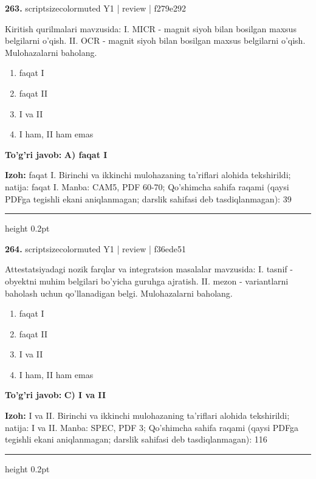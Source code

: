 \documentclass[10pt,a4paper]{article}
\begin{document}
{\bfseries\sffamily\color{ink} 263.} {scriptsizecolor{muted} Y1 | review | f279e292}
\par
Kiritish qurilmalari mavzusida: I. MICR - magnit siyoh bilan bosilgan maxsus belgilarni o'qish. II. OCR - magnit siyoh bilan bosilgan maxsus belgilarni o'qish. Mulohazalarni baholang.
\begin{enumerate}[label=\Alph*),leftmargin=9mm]
\item faqat I
\item faqat II
\item I va II
\item I ham, II ham emas
\end{enumerate}
\begin{tcolorbox}[enhanced,breakable,colback=teal!4,colframe=teal!60!black,boxrule=0.45pt,arc=1.2mm,left=2.7mm,right=2.7mm,top=1.8mm,bottom=1.8mm,before skip=2mm,after skip=2mm]
{\bfseries\sffamily\color{teal}To'g'ri javob:} \textbf{A) faqat I}
\par\smallskip
{\bfseries Izoh:} faqat I. Birinchi va ikkinchi mulohazaning ta'riflari alohida tekshirildi; natija: faqat I. Manba: CAM5, PDF 60-70; Qo'shimcha sahifa raqami (qaysi PDFga tegishli ekani aniqlanmagan; darslik sahifasi deb tasdiqlanmagan): 39
\end{tcolorbox}
\vspace{2mm}\hrule height 0.2pt\vspace{3mm}

{\bfseries\sffamily\color{ink} 264.} {scriptsizecolor{muted} Y1 | review | f36ede51}
\par
Attestatsiyadagi nozik farqlar va integratsion masalalar mavzusida: I. tasnif - obyektni muhim belgilari bo'yicha guruhga ajratish. II. mezon - variantlarni baholash uchun qo'llanadigan belgi. Mulohazalarni baholang.
\begin{enumerate}[label=\Alph*),leftmargin=9mm]
\item faqat I
\item faqat II
\item I va II
\item I ham, II ham emas
\end{enumerate}
\begin{tcolorbox}[enhanced,breakable,colback=teal!4,colframe=teal!60!black,boxrule=0.45pt,arc=1.2mm,left=2.7mm,right=2.7mm,top=1.8mm,bottom=1.8mm,before skip=2mm,after skip=2mm]
{\bfseries\sffamily\color{teal}To'g'ri javob:} \textbf{C) I va II}
\par\smallskip
{\bfseries Izoh:} I va II. Birinchi va ikkinchi mulohazaning ta'riflari alohida tekshirildi; natija: I va II. Manba: SPEC, PDF 3; Qo'shimcha sahifa raqami (qaysi PDFga tegishli ekani aniqlanmagan; darslik sahifasi deb tasdiqlanmagan): 116
\end{tcolorbox}
\vspace{2mm}\hrule height 0.2pt\vspace{3mm}
\end{document}
